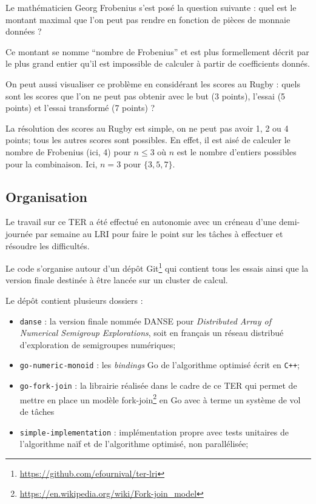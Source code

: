 \documentclass[12pt,a4paper]{article}
\let\leq\leqslant
\begin{document}
Le mathématicien Georg Frobenius s'est posé la question suivante : quel est le montant maximal que l'on peut pas rendre en fonction de pièces de monnaie données ?

Ce montant se nomme ``nombre de Frobenius'' et est plus formellement décrit par le plus grand entier qu'il est impossible de calculer à partir de coefficients donnés.

On peut aussi visualiser ce problème en considérant les scores au Rugby : quels sont les scores que l'on ne peut pas obtenir avec le but (3 points), l'essai (5 points) et l'essai transformé (7 points) ?

La résolution des scores au Rugby est simple, on ne peut pas avoir 1, 2 ou 4 points; tous les autres scores sont possibles. En effet, il est aisé de calculer le nombre de Frobenius (ici, 4) pour $n \leq 3$ où $n$ est le nombre d'entiers possibles pour la combinaison. Ici, $n = 3$ pour $\{3,5,7\}$.

\subsection*{Organisation}
Le travail sur ce TER a été effectué en autonomie avec un créneau d'une demi-journée par semaine au LRI pour faire le point sur les tâches à effectuer et résoudre les difficultés.

Le code s'organise autour d'un dépôt Git\footnote{\url{https://github.com/efournival/ter-lri}} qui contient tous les essais ainsi que la version finale destinée à être lancée sur un cluster de calcul.

Le dépôt contient plusieurs dossiers :
\begin{itemize}
	\item	\texttt{danse} : la version finale nommée DANSE pour \emph{Distributed Array of Numerical Semigroup Explorations}, soit en français un réseau distribué d'exploration de semigroupes numériques;
	\item	\texttt{go-numeric-monoid} : les \emph{bindings} Go de l'algorithme optimisé écrit en \texttt{C++};
	\item	\texttt{go-fork-join} : la librairie réalisée dans le cadre de ce TER qui permet de mettre en place un modèle fork-join\footnote{\url{https://en.wikipedia.org/wiki/Fork-join_model}} en Go avec à terme un système de vol de tâches
	\item	\texttt{simple-implementation} : implémentation propre avec tests unitaires de l'algorithme naïf et de l'algorithme optimisé, non parallélisée;
\end{itemize}
\end{document}
